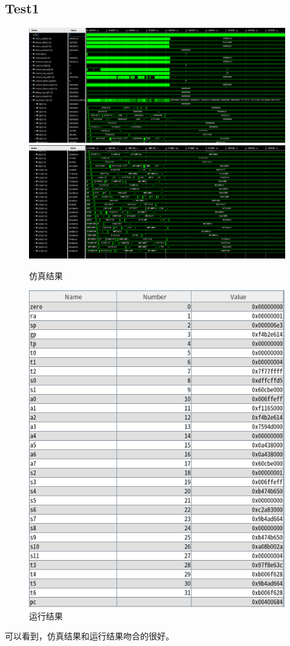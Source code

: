 \documentclass[12pt,a4paper]{ctexart}
\begin{document}
\subsection{Test1}
\begin{figure}[H]
    \centering
    \includegraphics[scale=0.4]{pic/1-1.png}
    \includegraphics[scale=0.4]{pic/1-2.png}
    \caption{仿真结果}
\end{figure}
\begin{figure}[H]
    \centering
    \includegraphics[scale=0.8]{pic/1.png}
    \caption{运行结果}
\end{figure}
可以看到，仿真结果和运行结果吻合的很好。
\end{document}
